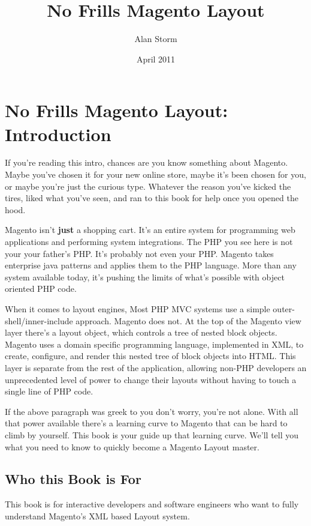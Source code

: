 \documentclass[oneside]{book}
\begin{document}
\title{No Frills Magento Layout}
\author{Alan Storm}
\date{April 2011}

\maketitle
\tableofcontents
\setcounter{chapter}{-1}

\chapter{No Frills Magento Layout: Introduction}
If you're reading this intro, chances are you know something about Magento.  Maybe you've chosen it for your new online store, maybe it's been chosen for you, or maybe you're just the curious type.  Whatever the reason you've kicked the tires, liked what you've seen, and ran to this book for help once you opened the hood.

Magento isn't \textbf{just} a shopping cart.  It's an entire system for programming web applications and performing system integrations.  The PHP you see here is not your your father's PHP.  It's probably not even your PHP.  Magento takes enterprise java patterns and applies them to the PHP language.  More than any system available today, it's pushing the limits of what's possible with object oriented PHP code. 

When it comes to layout engines, Most PHP MVC systems use a simple outer-shell/inner-include approach.  Magento does not.  At the top of the Magento view layer there's a layout object, which controls a tree of nested block objects. Magento uses a domain specific programming language, implemented in XML, to create, configure, and render this nested tree of block objects into HTML.  This layer is separate from the rest of the application, allowing non-PHP developers an unprecedented level of power to change their layouts without having to touch a single line of PHP code.

If the above paragraph was greek to you don't worry, you're not alone.  With all that power available there's a learning curve to Magento that can be hard to climb by yourself.   This book is your guide up that learning curve.  We'll tell you what you need to know to quickly become a Magento Layout master.

\section{Who this Book is For}

This book is for interactive developers and software engineers who want to fully understand Magento's XML based Layout system.
\end{document}
